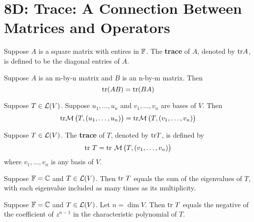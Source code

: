 \documentclass{extarticle}
\begin{document}


\newpage 
\section*{8D: Trace: A Connection Between Matrices and Operators}

\begin{definition}
    Suppose \(A\) is a square matrix with entires in \(\mathbb{F}\). The \textbf{trace} of \(A\), denoted by 
    \(\text{tr} A\), is defined to be the diagonal entries of \(A\).
\end{definition}

\begin{proposition}
    Suppose \(A\) is an m-by-n matrix and \(B\) is an n-by-m matrix. Then 
    \[\text{tr} (AB) = \text{tr} (BA)\]
\end{proposition}

\begin{lemma}
    Suppose \(T \in \mathcal{L}(V)\). Suppose \(u_1, \ldots, u_n\) and \(v_1, \ldots, v_n\) are bases of \(V\). Then 
    \[\text{tr} \mathcal{M} \left( T, \left( u_1, \ldots, u_n \right) \right) 
    = \text{tr} \mathcal{M} \left( T, \left( v_1, \ldots, v_n \right) \right)\]
\end{lemma}


\begin{definition}
    Suppose \(T \in \mathcal{L}(V)\). The \textbf{trace} of \(T\), denoted by \(\text{tr} T\), is defined by 
    \[\text{tr} \ T = \text{tr} \ \mathcal{M} \left( T, \left( v_1, \ldots, v_n \right) \right)\]
    where \(v_1, \ldots, v_n\) is any basis of \(V\).
\end{definition}


\begin{corollary}
    Suppose \(\mathbb{F} = \mathbb{C}\) and \(T \in \mathcal{L}(V)\). Then \(\text{tr} \ T\) equals the sum of the eigenvalues of \(T\), with 
    each eigenvalue included as many times as its multiplicity. 
\end{corollary}

\begin{corollary}
    Suppose \(\mathbb{F} = \mathbb{C}\) and \(T \in \mathcal{L}(V)\). Let \(n = \dim V\). Then \(\text{tr} \ T\) equals the negative 
    of the coefficient of \(z^{n-1}\) in the characteristic polynomial of \(T\).
\end{corollary}
\end{document}
